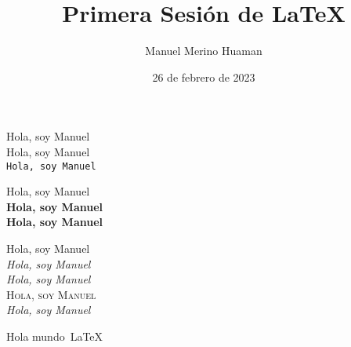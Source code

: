 \documentclass[a4paper,11pt]{article}
\author{Manuel Merino Huaman}
\title{Primera Sesión de \LaTeX}
\date{26 de febrero de 2023}
\begin{document}
    \maketitle
    
    \noindent  
    Hola, soy Manuel\\
    \textsf{Hola, soy Manuel}\\
    \texttt{Hola, soy Manuel}
       
    \noindent  
    Hola, soy Manuel\\
    {\bf Hola, soy Manuel}\\
    \textbf{Hola, soy Manuel}
    
    \noindent Hola, soy Manuel\\
    \textit{Hola, soy Manuel}\\
    \textsl{Hola, soy Manuel}\\
    \textsc{Hola, soy Manuel}\\
    \emph{Hola, soy Manuel}
    
    
    
    \newpage 
    \noindent 
    \textcolor{amaranth}{Hola mundo\, \LaTeX}
    
    
\end{document}
